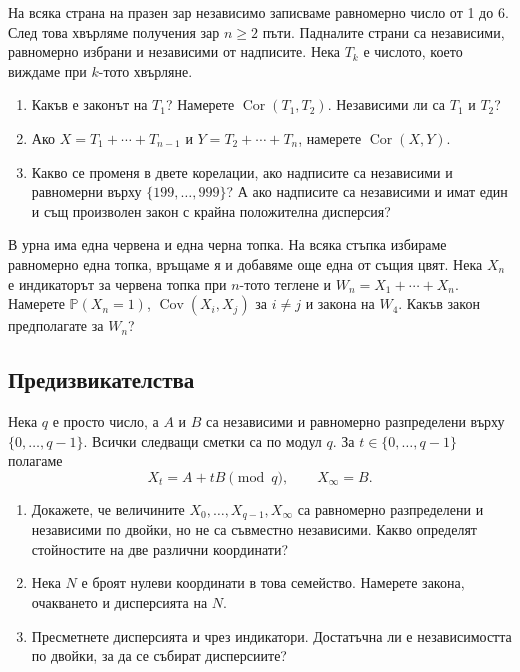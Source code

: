 \documentclass[11pt,a4paper]{article}
\newenvironment{enumeratea}{\begin{enumerate}[label=(\alph*),itemsep=0.28em,topsep=0.25em]}{\end{enumerate}}
\newcommand{\Pbb}{\mathbb P}
\newcommand{\Cov}{\operatorname{Cov}}
\newcommand{\Cor}{\operatorname{Cor}}
\newcounter{problem}[section]
\begin{document}
\begin{problempencil}
На всяка страна на празен зар независимо записваме равномерно число от 1 до 6.
След това хвърляме получения зар $n\ge2$ пъти. Падналите страни са независими,
равномерно избрани и независими от надписите. Нека $T_k$ е числото, което
виждаме при $k$-тото хвърляне.
\begin{enumeratea}
  \item Какъв е законът на $T_1$? Намерете $\Cor(T_1,T_2)$.
  Независими ли са $T_1$ и $T_2$?
  \item Ако $X=T_1+\cdots+T_{n-1}$ и $Y=T_2+\cdots+T_n$,
  намерете $\Cor(X,Y)$.
  \item Какво се променя в двете корелации, ако надписите са независими и
  равномерни върху $\{199,\ldots,999\}$? А ако надписите са независими
  и имат един и същ произволен закон с крайна положителна дисперсия?
\end{enumeratea}
\end{problempencil}

\begin{problem}
В урна има една червена и една черна топка. На всяка стъпка избираме равномерно
една топка, връщаме я и добавяме още една от същия цвят. Нека $X_n$ е
индикаторът за червена топка при $n$-тото теглене и $W_n=X_1+\cdots+X_n$.
Намерете $\Pbb(X_n=1)$, $\Cov(X_i,X_j)$ за $i\ne j$ и закона на $W_4$.
Какъв закон предполагате за $W_n$?
\end{problem}

\subsection*{Предизвикателства}

\begin{problemstar}
Нека $q$ е просто число, а $A$ и $B$ са независими и равномерно разпределени
върху $\{0,\ldots,q-1\}$. Всички следващи сметки са по модул $q$. За
$t\in\{0,\ldots,q-1\}$ полагаме
\[
X_t=A+tB\pmod q,\qquad X_\infty=B.
\]
\begin{enumeratea}
  \item Докажете, че величините $X_0,\ldots,X_{q-1},X_\infty$ са равномерно
  разпределени и независими по двойки, но не са съвместно независими.
  Какво определят стойностите на две различни координати?
  \item Нека $N$ е броят нулеви координати в това семейство.
  Намерете закона, очакването и дисперсията на $N$.
  \item Пресметнете дисперсията и чрез индикатори.
  Достатъчна ли е независимостта по двойки, за да се събират дисперсиите?
\end{enumeratea}
\end{problemstar}
\end{document}
